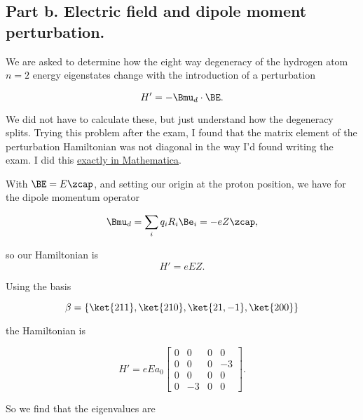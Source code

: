 \subsection{Part b.  Electric field and dipole moment perturbation.}

We are asked to determine how the eight way degeneracy of the hydrogen atom $n=2$ energy eigenstates change with the introduction of a perturbation

\begin{equation}\label{eqn:qmTwoExamReflection:570}
H' = -\Bmu_d \cdot \BE.
\end{equation}

We did not have to calculate these, but just understand how the degeneracy splits.  Trying this problem after the exam, I found that the matrix element of the perturbation Hamiltonian was not diagonal in the way I'd found writing the exam.  I did this \href{https://github.com/peeterjoot/physicsplay/blob/master/notes/phy456/qmTwoExamReflection.cdf}{exactly in Mathematica}.

With $\BE = E \zcap$, and setting our origin at the proton position, we have for the dipole momentum operator

\begin{equation}\label{eqn:qmTwoExamReflection:590}
\Bmu_d = \sum_i q_i R_i \Be_i = - e Z \zcap,
\end{equation}

so our Hamiltonian is
\begin{equation}\label{eqn:qmTwoExamReflection:610}
H' = e E Z.
\end{equation}

Using the basis

\begin{equation}\label{eqn:qmTwoExamReflection:630}
\beta = \{ 
\ket{211}, \ket{210}, \ket{21,-1}, \ket{200}
\}
\end{equation}

the Hamiltonian is

\begin{equation}\label{eqn:qmTwoExamReflection:650}
H' = 
e E a_0
\begin{bmatrix}
 0 & 0 & 0 & 0 \\
 0 & 0 & 0 & -3 \\
 0 & 0 & 0 & 0 \\
 0 & -3 & 0 & 0 
\end{bmatrix}.
\end{equation}

So we find that the eigenvalues are

